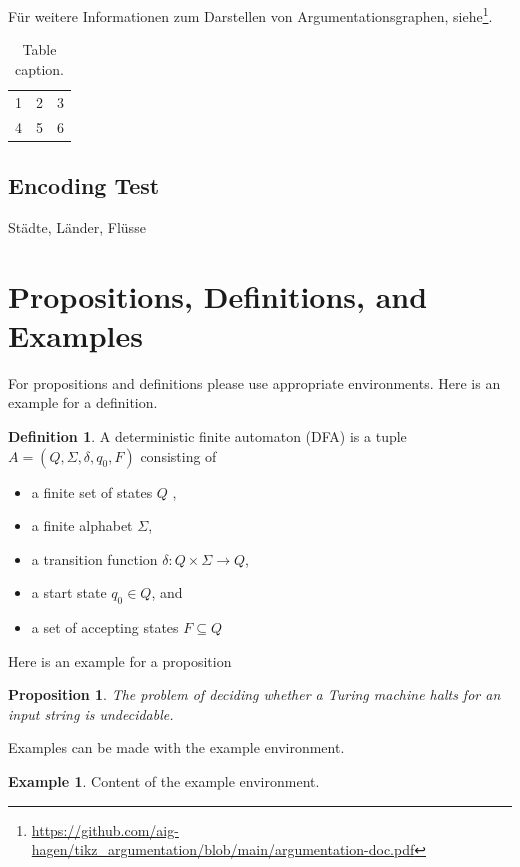 \documentclass[seminar,palatino]{AIGpaper}
\newtheorem{proposition}[theorem]{Proposition}
\theoremstyle{definition}
\newtheorem{definition}[theorem]{Definition}
\newtheorem{example}[theorem]{Example}
\begin{document}
Für weitere Informationen zum Darstellen von Argumentationsgraphen, siehe\footnote{\tiny\ttfamily\url{https://github.com/aig-hagen/tikz_argumentation/blob/main/argumentation-doc.pdf}}.


\begin{table}[ht]
\begin{center}
\begin{tabular}{lll}
\hline
1&2&3\\
4&5&6\\
\hline
\end{tabular}
\end{center}
\caption{Table caption.} \label{tab:t1}
\end{table}



\subsection{Encoding Test}
Städte, Länder, Flüsse


\section{Propositions, Definitions, and Examples}
For propositions and definitions please use appropriate environments.
Here is an example for a definition.

\begin{definition}
	A deterministic finite automaton (DFA) is a tuple \( A=(Q,\Sigma,\delta,q_0,F) \) consisting of
	\begin{itemize}
		\item a finite set of states \( Q \) ,
		\item a finite alphabet \( \Sigma \),
		\item a transition function \( \delta:Q\times\Sigma\to Q \), 
		\item a start state \( q_0 \in Q \), and
		\item a set of accepting states \( F \subseteq Q \)
	\end{itemize}
\end{definition}

Here is an example for a proposition

\begin{proposition}
	The problem of deciding whether a Turing machine halts for an input string is undecidable.
\end{proposition}

Examples can be made with the example environment.

\begin{example}
	Content of the example environment.
\end{example}


\addreferences

\end{document}
